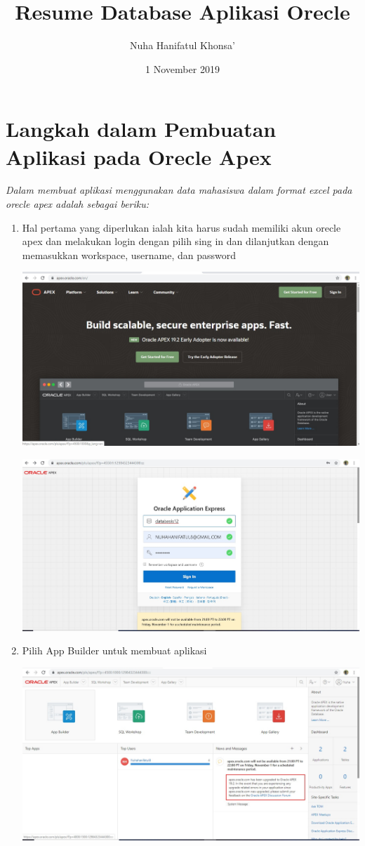 \documentclass[a4paper,12pt]{report}
\title{Resume Database Aplikasi Orecle}
\author{Nuha Hanifatul Khonsa'}
\date{ 1 November 2019}
\begin{document}
\maketitle

\section{Langkah dalam Pembuatan Aplikasi pada Orecle Apex}
\textit{Dalam membuat aplikasi menggunakan data mahasiswa dalam format excel pada orecle apex adalah sebagai beriku:}

\begin{enumerate}
    \item Hal pertama yang diperlukan ialah kita harus sudah memiliki akun orecle apex dan melakukan login dengan pilih sing in dan dilanjutkan dengan memasukkan workspace, username, dan password
    \begin{center}
    \includegraphics[width=11cm\textwidth]{figure/1.jpg}
    \end{center}
    \begin{center}
    \includegraphics[width=11cm\textwidth]{figure/2.jpg}
    \end{center}
    \item Pilih App Builder untuk membuat aplikasi
    \begin{center}
    \includegraphics[width=11cm\textwidth]{figure/3.jpg}

\end{center}
\end{enumerate}
\end{document}
